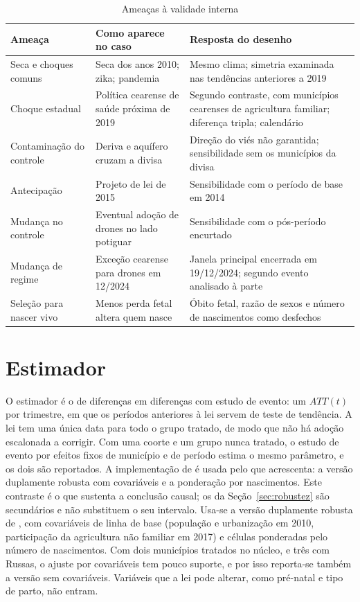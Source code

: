 \begin{table}[ht]
\centering\small
\caption{Ameaças à validade interna}
\label{tab:ameacas}
\begin{tabularx}{\textwidth}{@{}p{3.2cm}LL@{}}
\toprule
Ameaça & Como aparece no caso & Resposta do desenho \\
\midrule
Seca e choques comuns & Seca dos anos 2010; zika; pandemia & Mesmo clima; simetria examinada nas tendências anteriores a 2019 \\
Choque estadual & Política cearense de saúde próxima de 2019 & Segundo contraste, com municípios cearenses de agricultura familiar; diferença tripla; calendário \\
Contaminação do controle & Deriva e aquífero cruzam a divisa & Direção do viés não garantida; sensibilidade sem os municípios da divisa \\
Antecipação & Projeto de lei de 2015 & Sensibilidade com o período de base em 2014 \\
Mudança no controle & Eventual adoção de drones no lado potiguar & Sensibilidade com o pós-período encurtado \\
Mudança de regime & Exceção cearense para drones em 12/2024 & Janela principal encerrada em 19/12/2024; segundo evento analisado à parte \\
Seleção para nascer vivo & Menos perda fetal altera quem nasce & Óbito fetal, razão de sexos e número de nascimentos como desfechos \\
\bottomrule
\end{tabularx}
\end{table}

\section{Estimador}
\label{sec:estimador}

O estimador é o de diferenças em diferenças com estudo de evento: um $ATT(t)$
por trimestre, em que os períodos anteriores à lei servem de teste de
tendência. A lei tem uma única data para todo o grupo tratado, de modo que não
há adoção escalonada a corrigir. Com uma coorte e um grupo nunca tratado, o
estudo de evento por efeitos fixos de município e de período estima o mesmo
parâmetro, e os dois são reportados. A implementação de
 é usada pelo que acrescenta: a versão
duplamente robusta com covariáveis e a ponderação por nascimentos. Este
contraste é o que sustenta a conclusão
causal; os da Seção~\ref{sec:robustez} são secundários e não substituem o seu
intervalo.
Usa-se a versão duplamente robusta de ,
com covariáveis de linha de base (população e urbanização em 2010, participação
da agricultura não familiar em 2017) e células ponderadas pelo número de
nascimentos. Com dois municípios tratados no núcleo, e três com Russas, o ajuste por covariáveis tem
pouco suporte, e por isso reporta-se também a versão sem covariáveis. Variáveis
que a lei pode alterar, como pré-natal e tipo de parto, não entram.

